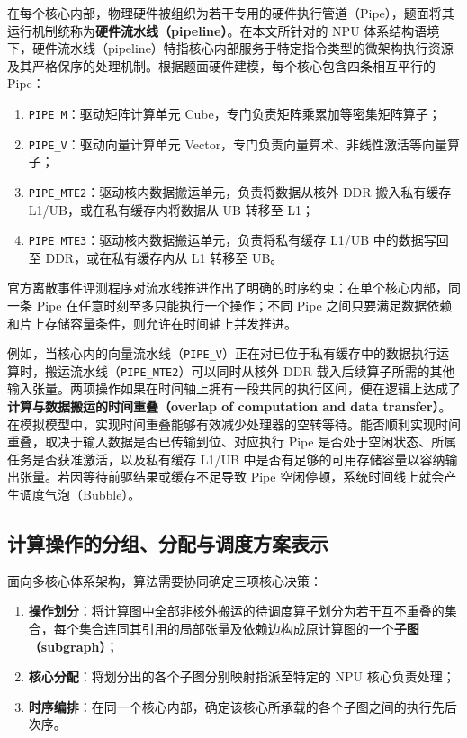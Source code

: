 \documentclass[anonymous,withtoc]{gmcm2026}
\providecommand{\tightlist}{\setlength{\itemsep}{0pt}\setlength{\parskip}{0pt}}
\begin{document}
在每个核心内部，物理硬件被组织为若干专用的硬件执行管道（Pipe），题面将其运行机制统称为\textbf{硬件流水线（pipeline）}。在本文所针对的 NPU 体系结构语境下，硬件流水线（pipeline）特指核心内部服务于特定指令类型的微架构执行资源及其严格保序的处理机制。根据题面硬件建模，每个核心包含四条相互平行的 Pipe：

\begin{enumerate}
\def\labelenumi{\arabic{enumi}.}
\tightlist
\item
  \texttt{PIPE\_M}：驱动矩阵计算单元 Cube，专门负责矩阵乘累加等密集矩阵算子；
\item
  \texttt{PIPE\_V}：驱动向量计算单元 Vector，专门负责向量算术、非线性激活等向量算子；
\item
  \texttt{PIPE\_MTE2}：驱动核内数据搬运单元，负责将数据从核外 DDR 搬入私有缓存 L1/UB，或在私有缓存内将数据从 UB 转移至 L1；
\item
  \texttt{PIPE\_MTE3}：驱动核内数据搬运单元，负责将私有缓存 L1/UB 中的数据写回至 DDR，或在私有缓存内从 L1 转移至 UB。
\end{enumerate}

官方离散事件评测程序对流水线推进作出了明确的时序约束：在单个核心内部，同一条 Pipe 在任意时刻至多只能执行一个操作；不同 Pipe 之间只要满足数据依赖和片上存储容量条件，则允许在时间轴上并发推进。

例如，当核心内的向量流水线（\texttt{PIPE\_V}）正在对已位于私有缓存中的数据执行运算时，搬运流水线（\texttt{PIPE\_MTE2}）可以同时从核外 DDR 载入后续算子所需的其他输入张量。两项操作如果在时间轴上拥有一段共同的执行区间，便在逻辑上达成了\textbf{计算与数据搬运的时间重叠（overlap of computation and data transfer）}。在模拟模型中，实现时间重叠能够有效减少处理器的空转等待。能否顺利实现时间重叠，取决于输入数据是否已传输到位、对应执行 Pipe 是否处于空闲状态、所属任务是否获准激活，以及私有缓存 L1/UB 中是否有足够的可用存储容量以容纳输出张量。若因等待前驱结果或缓存不足导致 Pipe 空闲停顿，系统时间线上就会产生调度气泡（Bubble）。

\subsection{计算操作的分组、分配与调度方案表示}

面向多核心体系架构，算法需要协同确定三项核心决策：

\begin{enumerate}
\def\labelenumi{\arabic{enumi}.}
\tightlist
\item
  \textbf{操作划分}：将计算图中全部非核外搬运的待调度算子划分为若干互不重叠的集合，每个集合连同其引用的局部张量及依赖边构成原计算图的一个\textbf{子图（subgraph）}；
\item
  \textbf{核心分配}：将划分出的各个子图分别映射指派至特定的 NPU 核心负责处理；
\item
  \textbf{时序编排}：在同一个核心内部，确定该核心所承载的各个子图之间的执行先后次序。
\end{enumerate}
\end{document}
